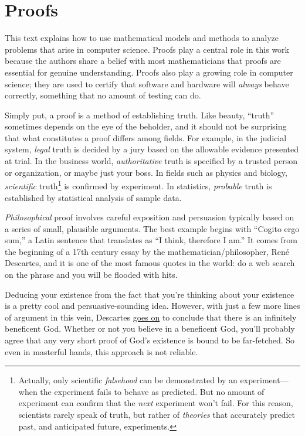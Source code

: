 \part{Proofs}
\label{part:proofs}

\partintro

This text explains how to use mathematical models and methods to analyze
problems that arise in computer science.  Proofs play a central role in
this work because the authors share a belief with  most mathematicians that proofs are
essential for genuine understanding.  Proofs also play a growing role in
computer science; they are used to certify that software and hardware will
\emph{always} behave correctly, something that no amount of testing can
do.

Simply put, a proof is a method of establishing truth.  Like beauty,
``truth'' sometimes depends on the eye of the beholder, and
it should not be surprising that what constitutes a proof differs
among fields.  For example, in the judicial system, \emph{legal} truth
is decided by a jury based on the allowable evidence presented at
trial.  In the business world, \emph{authoritative} truth is specified
by a trusted person or organization, or maybe just your boss.  In
fields such as physics and biology, \emph{scientific}
truth\footnote{Actually, only scientific
\emph{falsehood} can be demonstrated by an experiment---when
the experiment fails to behave as predicted.  But no amount of
experiment can confirm that the \emph{next} experiment won't fail.
For this reason, scientists rarely speak of truth, but rather
of \emph{theories} that accurately predict past, and anticipated
future, experiments.} is confirmed by experiment.  In
statistics, \emph{probable} truth is established by statistical
analysis of sample data.

\emph{Philosophical} proof involves careful exposition and
persuasion typically based on a series of small, plausible arguments.
The best example begins with ``Cogito ergo sum,'' a Latin sentence
that translates as ``I think, therefore I am.''  It comes from the
beginning of a 17th century essay by the mathematician/philosopher,
Ren\'e Descartes, and it is one of the most famous quotes in the
world: do a web search on the phrase and you will be flooded with
hits.

Deducing your existence from the fact that you're thinking about your
existence is a pretty cool and persuasive-sounding idea.
However, with just a few more lines of argument in this vein, Descartes
\href{http://www.btinternet.com/~glynhughes/squashed/descartes.htm}{goes
  on} to conclude that there is an infinitely beneficent God.  Whether
or not you believe in a beneficent God, you'll probably agree that any
very short proof of God's existence is bound to be far-fetched.  So even
in masterful hands, this approach is not reliable.

